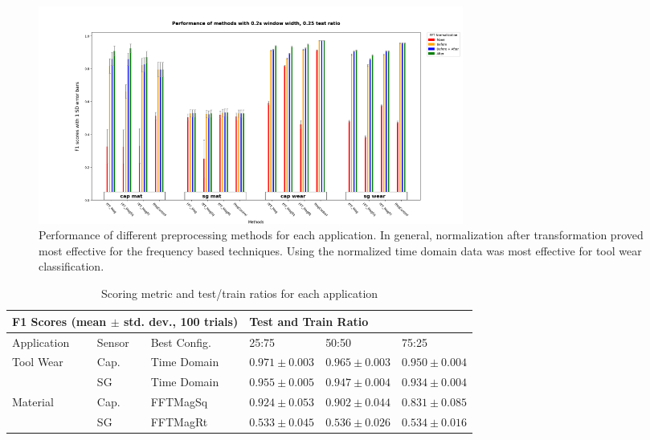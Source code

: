 \begin{figure}[t!]
\centering
\centerline{\includegraphics[width=5.5in]{figures/p1_media/Fig11.png}}
\caption{
Performance of different preprocessing methods for each application. In general, normalization
 after transformation proved most effective for the frequency based techniques. 
 Using the normalized time domain data was most effective for tool wear classification.
}
\label{fig:methods}
\end{figure}

\begin{table}[]
\caption{Scoring metric and test/train ratios for each application}
\begin{tabular}{lll|lll}
\multicolumn{3}{l|}{F1 Scores (mean $\pm$ std. dev., 100 trials)}                                                        & \multicolumn{3}{l}{Test and Train Ratio} \\ \hline
Application                                     & Sensor                    & Best Config.                
   & 25:75      & 50:50      & 75:25      \\ \hline
\multicolumn{1}{l|}{\multirow{2}{*}{Tool Wear}} & \multicolumn{1}{l|}{Cap.} & Time Domain 
   & $0.971 \pm  0.003$   & $0.965 \pm 0.003$ & $0.950 \pm 0.004$  \\ \cline{2-6} 
\multicolumn{1}{l|}{}                           & \multicolumn{1}{l|}{SG}   & Time Domain 
   & $0.955 \pm 0.005$    & $0.947 \pm 0.004$ & $0.934 \pm 0.004$  \\ \hline
\multicolumn{1}{l|}{\multirow{2}{*}{Material}}  & \multicolumn{1}{l|}{Cap.} & FFTMagSq 
   & $0.924 \pm 0.053$    & $0.902 \pm 0.044$ & $0.831 \pm 0.085$  \\ \cline{2-6} 
\multicolumn{1}{l|}{}                           & \multicolumn{1}{l|}{SG}   & FFTMagRt 
   & $0.533 \pm 0.045$    & $0.536 \pm 0.026$ & $0.534 \pm 0.016$  
\end{tabular}
\label{tab:fourscores}
\end{table}

